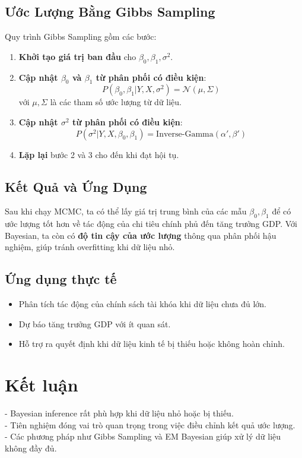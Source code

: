   \subsection{Ước Lượng Bằng Gibbs Sampling}
   Quy trình Gibbs Sampling gồm các bước:
   \begin{enumerate}
       \item \textbf{Khởi tạo giá trị ban đầu} cho $\beta_0, \beta_1, \sigma^2$.
       \item \textbf{Cập nhật $\beta_0$ và $\beta_1$ từ phân phối có điều kiện}:
       \begin{equation}
           P(\beta_0, \beta_1 | Y, X, \sigma^2) = \mathcal{N}(\mu, \Sigma)
       \end{equation}
       với $\mu, \Sigma$ là các tham số ước lượng từ dữ liệu.
       \item \textbf{Cập nhật $\sigma^2$ từ phân phối có điều kiện}:
       \begin{equation}
           P(\sigma^2 | Y, X, \beta_0, \beta_1) = \text{Inverse-Gamma}(\alpha', \beta')
       \end{equation}
       \item \textbf{Lặp lại} bước 2 và 3 cho đến khi đạt hội tụ.
   \end{enumerate}
   
   \subsection{Kết Quả và Ứng Dụng}
   Sau khi chạy MCMC, ta có thể lấy giá trị trung bình của các mẫu $\beta_0, \beta_1$ để có ước lượng tốt hơn về tác động của chi tiêu chính phủ đến tăng trưởng GDP. Với Bayesian, ta còn có \textbf{độ tin cậy của ước lượng} thông qua phân phối hậu nghiệm, giúp tránh overfitting khi dữ liệu nhỏ.
   
   \subsection{Ứng dụng thực tế}
   \begin{itemize}
       \item Phân tích tác động của chính sách tài khóa khi dữ liệu chưa đủ lớn.
       \item Dự báo tăng trưởng GDP với ít quan sát.
       \item Hỗ trợ ra quyết định khi dữ liệu kinh tế bị thiếu hoặc không hoàn chỉnh.
   \end{itemize}


\section{Kết luận}
- Bayesian inference rất phù hợp khi dữ liệu nhỏ hoặc bị thiếu.\\
- Tiên nghiệm đóng vai trò quan trọng trong việc điều chỉnh kết quả ước lượng.\\
- Các phương pháp như Gibbs Sampling và EM Bayesian giúp xử lý dữ liệu không đầy đủ.